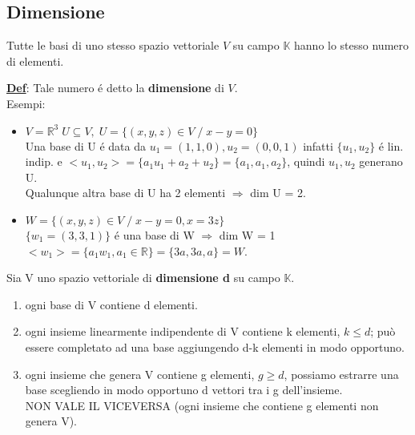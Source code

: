 \documentclass[12pt]{article}
\begin{document}
\subsection{Dimensione}

 
 \begin{theorem} Tutte le basi di uno stesso spazio vettoriale $V$ su campo $\mathbb{K}$ hanno lo stesso numero di elementi.
 \label{dimensione basi}
 \end{theorem}
\textbf{\underline{Def}}: Tale numero é detto la \textbf{dimensione} di $V$.\\
Esempi:
\begin{itemize}
    \item $V = \mathbb{R}^3\; U \subseteq V, \; U = \{(x,y,z) \in V\;/\; x-y = 0\}$\\
    Una base di U é data da $u_1 = (1,1,0), u_2 = (0,0,1)$ infatti $\{u_1,u_2\}$ é lin. indip. e $<u_1,u_2> = \{a_1u_1+a_2+u_2\}=\{a_1,a_1,a_2\}$, quindi $u_1,u_2$ generano U.\\
    Qualunque altra base di U ha 2 elementi $\Longrightarrow$ dim U = 2.
    \item $W = \{(x,y,z) \in V \;/\; x-y = 0, x=3z\}$\\
    $\{w_1 = (3,3,1)\}$ é una base di W $\Longrightarrow$ dim W = 1\\
    $<w_1> = \{a_1w_1, a_1 \in \mathbb R\} = \{3a,3a,a\} = W$.
\end{itemize}
Sia V uno spazio vettoriale di \textbf{dimensione d} su campo $\mathbb{K}$.
\begin{enumerate}
    \item ogni base di V contiene d elementi.
    \item ogni insieme linearmente indipendente di V contiene k elementi, $k\leq d$; può essere completato ad una base aggiungendo d-k elementi in modo opportuno.
    \item ogni insieme che genera V contiene g elementi, $g \geq d$, possiamo estrarre una base scegliendo in modo opportuno d vettori tra i g dell'insieme. \\NON VALE IL VICEVERSA (ogni insieme che contiene g elementi non genera V).
\end{enumerate}
\end{document}
